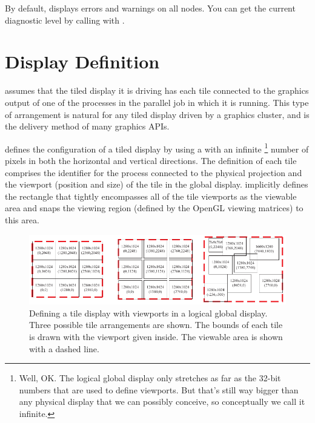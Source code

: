 By default, \IceT displays errors and warnings on all nodes.  You can get
the current diagnostic level by calling  with
.



\section{Display Definition}
\label{sec:Basic_Usage:Display_Definition}


\IceT assumes that the tiled display it is driving has each tile connected
to the graphics output of one of the processes in the parallel job in which
it is running.  This type of arrangement is natural for any tiled display
driven by a graphics cluster, and is the delivery method of many graphics
APIs. %

\IceT defines the configuration of a tiled display by using a
 with an infinite \footnote{Well, OK.  The logical global display
  only stretches as far as the 32-bit numbers that are used to define
  viewports.  But that's still way bigger than any physical display that we
  can possibly conceive, so conceptually we call it infinite.} number of
pixels in both the horizontal and vertical directions.  The definition of
each tile comprises the identifier for the process connected to the
physical projection and the viewport (position and size) of the tile in the
global display.  \IceT implicitly defines the rectangle that tightly
encompasses all of the tile viewports as the viewable area and snaps the
viewing region (defined by the OpenGL viewing matrices) to this area.

\begin{figure}
  \centering
  \includegraphics{images/ExampleTileConfig}
  \caption[Defining a tile display.]{Defining a tile display with viewports
    in a logical global display.  Three possible tile arrangements are
    shown.  The bounds of each tile is drawn with the viewport given
    inside.  The viewable area is shown with a dashed line.}
  \label{fig:BasicUsage:tile_layout}
\end{figure}

